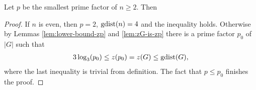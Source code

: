 \begin{thm}
\label{thm:lower-bound}
Let $p$ be the smallest prime factor of $n \geq 2$. Then
%
\end{thm}%
\begin{proof} %
If $n$ is even, then $p=2$, $\mathop{\mathrm{gdist}}(n) = 4$ and the inequality holds. Otherwise by Lemmas \ref{lem:lower-bound-zp} and \ref{lem:zG-is-zp} there is a prime factor $p_0$ of $|G|$ such that
\begin{align}
	3 \log_3(p_0) \leq z(p_0) = z(G) \leq \mathop{\mathrm{gdist}}(G),
\end{align}
where the last inequality is trivial from definition. The fact that $p \leq p_0$ finishes the proof.
\end{proof}
